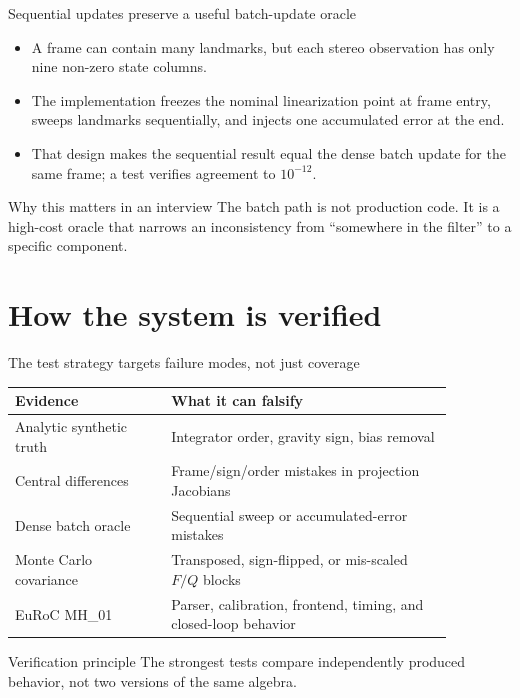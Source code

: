 \documentclass[10pt,aspectratio=169]{beamer}
\begin{document}
\begin{frame}{Sequential updates preserve a useful batch-update oracle}
  \begin{itemize}
    \item A frame can contain many landmarks, but each stereo observation has only nine non-zero state columns.
    \item The implementation freezes the nominal linearization point at frame entry, sweeps landmarks sequentially, and injects one accumulated error at the end.
    \item That design makes the sequential result equal the dense batch update for the same frame; a test verifies agreement to $10^{-12}$.
  \end{itemize}
  \vspace{1em}
  \begin{block}{Why this matters in an interview}
    The batch path is not production code. It is a high-cost oracle that narrows an inconsistency from ``somewhere in the filter'' to a specific component.
  \end{block}
\end{frame}

\section{How the system is verified}

\begin{frame}{The test strategy targets failure modes, not just coverage}
  \begin{tabular}{p{0.31\linewidth}p{0.56\linewidth}}
    \toprule
    Evidence & What it can falsify \\
    \midrule
    Analytic synthetic truth & Integrator order, gravity sign, bias removal \\
    Central differences & Frame/sign/order mistakes in projection Jacobians \\
    Dense batch oracle & Sequential sweep or accumulated-error mistakes \\
    Monte Carlo covariance & Transposed, sign-flipped, or mis-scaled $F/Q$ blocks \\
    EuRoC MH\_01 & Parser, calibration, frontend, timing, and closed-loop behavior \\
    \bottomrule
  \end{tabular}
  \vspace{1em}
  \begin{alertblock}{Verification principle}
    The strongest tests compare independently produced behavior, not two versions of the same algebra.
  \end{alertblock}
\end{frame}
\end{document}

